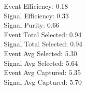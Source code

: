 Event  Efficiency:     0.18\\
Signal Efficiency:     0.33\\
Signal Purity:         0.66\\
Event  Total Selected: 0.94\\
Signal Total Selected: 0.94\\
Event  Avg Selected:   5.30\\
Signal Avg Selected:   5.64\\
Event  Avg Captured:   5.35\\
Signal Avg Captured:   5.70